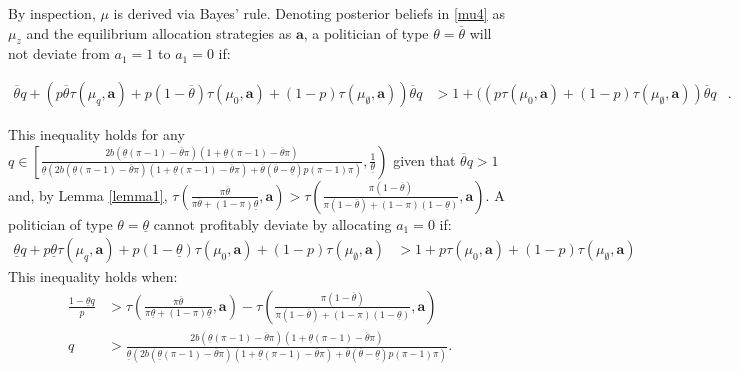 \documentclass[11pt,english]{article}
\begin{document}
By inspection, $\mu$ is derived via Bayes' rule. Denoting posterior beliefs in \eqref{mu4} as $\mu_z$ and the equilibrium allocation strategies as $\boldsymbol{a}$, a politician of type $\theta = \overline{\theta}$ will not deviate from $a_1 = 1$ to $a_1 = 0$  if:

\begin{align*}
\overline{\theta}q + (p\overline{\theta}\tau(\mu_q, \boldsymbol{a}) + p(1-\overline{\theta})\tau(\mu_0, \boldsymbol{a}) + (1-p) \tau(\mu_\emptyset, \boldsymbol{a}))\overline{\theta}q& > 1 + ((p\tau(\mu_0, \boldsymbol{a}) + (1-p) \tau(\mu_\emptyset, \boldsymbol{a})) \overline{\theta}q&.
\end{align*}

\noindent This inequality holds for any $q \in \left[\frac{2b(\underline{\theta}(\pi - 1)-\overline{\theta}\pi)(1+\underline{\theta}(\pi - 1)-\overline{\theta}\pi)}{\underline{\theta}\left(2b(\underline{\theta}(\pi - 1)-\overline{\theta}\pi)(1+\underline{\theta}(\pi - 1)-\overline{\theta}\pi) + \overline{\theta}(\overline{\theta}-\underline{\theta})p(\pi-1)\pi\right)}, \frac{1}{\underline{\theta}}\right)$ given that $\overline{\theta}q > 1$ and, by Lemma \ref{lemma1}, $\tau(\frac{\pi \overline{\theta}}{\pi \overline{\theta} + (1-\pi)\underline{\theta}}, \boldsymbol{a}) > \tau(\frac{\pi (1-\overline{\theta})}{\pi (1-\overline{\theta}) + (1-\pi)(1-\underline{\theta})}, \boldsymbol{a})$. A politician of type $\theta = \underline{\theta}$ cannot profitably deviate by allocating $a_1=0$ if:
\begin{align*}
\underline{\theta}q + p\underline{\theta}\tau(\mu_q, \boldsymbol{a}) + p(1-\underline{\theta})\tau(\mu_0, \boldsymbol{a}) + (1-p) \tau(\mu_\emptyset, \boldsymbol{a}) & > 
1 + p\tau(\mu_0, \boldsymbol{a}) + (1-p) \tau(\mu_\emptyset, \boldsymbol{a})
\end{align*}
This inequality holds when:
\begin{align*}
 \frac{1-\underline{\theta}q}{p} &>\tau(\frac{\pi \overline{\theta}}{\pi \underline{\theta} + (1-\pi)\underline{\theta}}, \boldsymbol{a}) - \tau(\frac{\pi (1-\overline{\theta})}{\pi (1-\overline{\theta}) + (1-\pi)(1-\underline{\theta})}, \boldsymbol{a})\\
 q &> \frac{2b(\underline{\theta}(\pi - 1)-\overline{\theta}\pi)(1+\underline{\theta}(\pi - 1)-\overline{\theta}\pi)}{\underline{\theta}\left(2b(\underline{\theta}(\pi - 1)-\overline{\theta}\pi)(1+\underline{\theta}(\pi - 1)-\overline{\theta}\pi) + \overline{\theta}(\overline{\theta}-\underline{\theta})p(\pi-1)\pi\right)}.
\end{align*}
\end{document}

